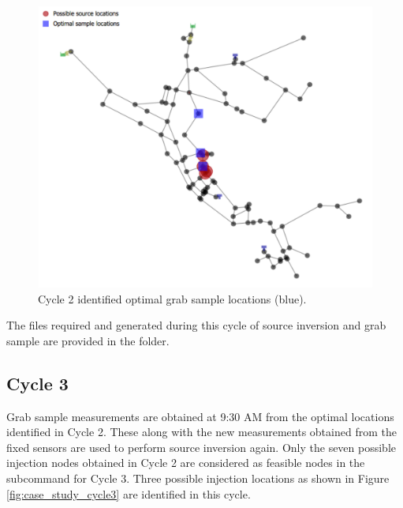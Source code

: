 \begin{figure}[!ht]
\begin{center}
\includegraphics[scale=0.6]{graphics/inversion_cs_cycle2.pdf}
\caption{Cycle 2 identified optimal grab sample locations (blue).}
\label{fig:case_study_cycle2}
\end{center}
\end{figure}

The files required and generated during this cycle of source inversion and grab sample are 
provided in the  folder.  
        
\subsection{Cycle 3}
Grab sample measurements are obtained at 9:30 AM from the optimal locations identified in Cycle 2. 
These along with the new measurements obtained from the fixed sensors are used to perform source inversion again. 
Only the seven possible injection nodes obtained in Cycle 2 are considered as feasible nodes in the  subcommand 
for Cycle 3. Three possible injection locations as shown in Figure \ref{fig:case_study_cycle3} are identified in this cycle.

